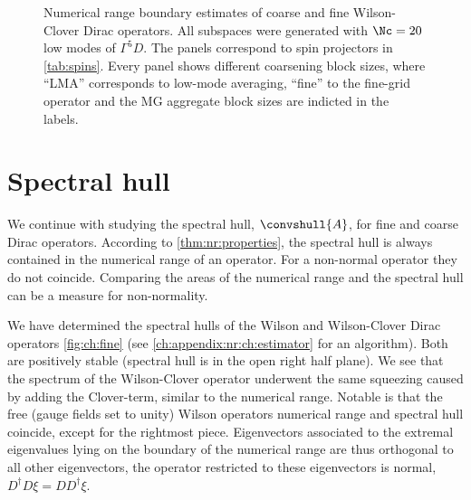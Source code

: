 \begin{figure}
\centering

\hfill
{}

\hfill
{}

\caption{
Numerical range boundary estimates of coarse and fine Wilson-Clover Dirac operators.
All subspaces were generated with $\Nc=20$ low modes of $\Gamma^{5} D$.
The panels correspond to spin projectors in \cref{tab:spins}.
Every panel shows different coarsening block sizes, where ``LMA'' corresponds to low-mode averaging, ``fine'' to the fine-grid operator and the MG aggregate block sizes are indicted in the labels.
}
\label{fig:nr:coarse}
\end{figure}

\section{Spectral hull}

We continue with studying the spectral hull, $\convshull{A}$, for fine and coarse Dirac operators.
According to \cref{thm:nr:properties}, the spectral hull is always contained in the numerical range of an operator.
For a non-normal operator they do not coincide.
Comparing the areas of the numerical range and the spectral hull can be a measure for non-normality.

We have determined the spectral hulls of the Wilson and Wilson-Clover Dirac operators \cref{fig:ch:fine} (see \cref{ch:appendix:nr:ch:estimator} for an algorithm).
Both are positively stable (spectral hull is in the open right half plane).
We see that the spectrum of the Wilson-Clover operator underwent the same squeezing caused by adding the Clover-term, similar to the numerical range.
Notable is that the free (gauge fields set to unity) Wilson operators numerical range and spectral hull coincide, except for the rightmost piece.
Eigenvectors associated to the extremal eigenvalues lying on the boundary of the numerical range are thus orthogonal to all other eigenvectors, \ie the operator restricted to these eigenvectors is normal, $D^\dagger D \xi = D D^\dagger \xi$.

